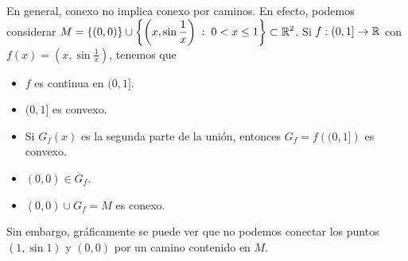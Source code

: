\begin{eg}
	En general, conexo no implica conexo por caminos. En efecto, podemos considerar $\displaystyle M = \left\{ \left(0,0\right)\right\} \cup \left\{ \left(x,\sin \frac{1}{x}\right) \; : \; 0 < x \leq 1\right\} \subset \mathbb{R}^{2} $. Si $\displaystyle f : (0,1] \to \mathbb{R} $ con $\displaystyle f\left(x\right) = \left(x,\sin \frac{1}{x}\right) $, tenemos que
	\begin{itemize}
		\item $\displaystyle f $ es continua en $\displaystyle (0,1] $.
		\item $\displaystyle (0,1] $ es convexo.
		\item Si $\displaystyle G_{f}\left(x\right) $ es la segunda parte de la unión, entonces $\displaystyle G_{f} = f\left((0,1]\right) $ es convexo.
		\item $\displaystyle \left(0,0\right) \in \overline{G}_{f} $.
		\item $\displaystyle \left(0,0\right)\cup G_{f} = M $ es conexo.
	\end{itemize}
	Sin embargo, gráficamente se puede ver que no podemos conectar los puntos $\displaystyle \left(1,\sin 1\right) $ y $\displaystyle \left(0,0\right) $ por un camino contenido en $\displaystyle M $.
\end{eg}
